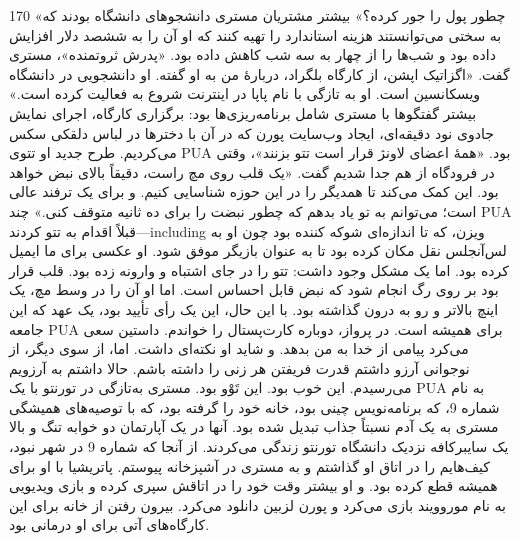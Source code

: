 170  
«چطور پول را جور کرده؟» بیشتر مشتریان مستری دانشجوهای دانشگاه بودند که به سختی می‌توانستند هزینه استاندارد را تهیه کنند که او آن را به ششصد دلار افزایش داده بود و شب‌ها را از چهار به سه شب کاهش داده بود.  
«پدرش ثروتمنده»، مستری گفت. «اگزاتیک اپشن، از کارگاه بلگراد، دربارهٔ من به او گفته. او دانشجویی در دانشگاه ویسکانسین است. او به تازگی با نام پاپا در اینترنت شروع به فعالیت کرده است.»  
بیشتر گفتگوها با مستری شامل برنامه‌ریزی‌ها بود: برگزاری کارگاه، اجرای نمایش جادوی نود دقیقه‌ای، ایجاد وب‌سایت پورن که در آن با دخترها در لباس دلقکی سکس می‌کردیم. طرح جدید او تتوی PUA بود.  
«همهٔ اعضای لاونژ قرار است تتو  بزنند»، وقتی در فرودگاه از هم جدا شدیم گفت. «یک قلب روی مچ راست، دقیقاً بالای نبض خواهد بود. این کمک می‌کند تا همدیگر را در این حوزه شناسایی کنیم. و برای یک ترفند عالی است؛ می‌توانم به تو یاد بدهم که چطور نبضت را برای ده ثانیه متوقف کنی.»  
چند PUA قبلاً اقدام به تتو کردند—including ویزن، که تا اندازه‌ای شوکه کننده بود چون او به لس‌آنجلس نقل مکان کرده بود تا به عنوان بازیگر موفق شود. او عکسی برای ما ایمیل کرده بود. اما یک مشکل وجود داشت: تتو را در جای اشتباه و وارونه زده بود. قلب قرار بود بر روی رگ انجام شود که نبض قابل احساس است. اما او آن را در وسط مچ، یک اینچ بالاتر و رو به درون گذاشته بود.  
با این حال، این یک رأی تأیید بود، یک عهد که این جامعه PUA برای همیشه است.  
در پرواز، دوباره کارت‌پستال را خواندم. داستین سعی می‌کرد پیامی از خدا به من بدهد. و شاید او نکته‌ای داشت. اما، از سوی دیگر، از نوجوانی آرزو داشتم قدرت فریفتن هر زنی را داشته باشم. حالا داشتم به آرزویم می‌رسیدم. این خوب بود. این تَوْو بود.  
مستری به‌تازگی در تورنتو با یک PUA به نام شماره 9، که برنامه‌نویس چینی بود، خانه خود را گرفته بود، که با توصیه‌های همیشگی مستری به یک آدم نسبتاً جذاب تبدیل شده بود. آنها در یک آپارتمان دو خوابه تنگ و بالا یک سایبرکافه نزدیک دانشگاه تورنتو زندگی می‌کردند.  
از آنجا که شماره 9 در شهر نبود، کیف‌هایم را در اتاق او گذاشتم و به مستری در آشپزخانه پیوستم. پاتریشیا با او برای همیشه قطع کرده بود. و او بیشتر وقت خود را در اتاقش سپری کرده و بازی ویدیویی به نام موروویند بازی می‌کرد و پورن لزبین دانلود می‌کرد. بیرون رفتن از خانه برای این کارگاه‌های آتی برای او درمانی بود.